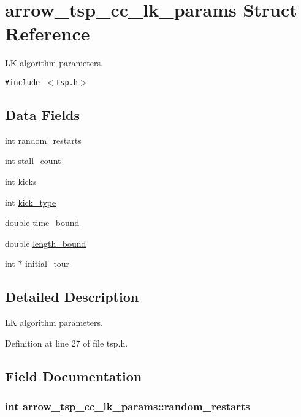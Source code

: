 \hypertarget{structarrow__tsp__cc__lk__params}{
\section{arrow\_\-tsp\_\-cc\_\-lk\_\-params Struct Reference}
\label{structarrow__tsp__cc__lk__params}
}
LK algorithm parameters.  


{\tt \#include $<$tsp.h$>$}

\subsection*{Data Fields}
\begin{CompactItemize}
\item 
int \hyperlink{structarrow__tsp__cc__lk__params_291c8a0ec4208ae75229c223dcf1160a}{random\_\-restarts}
\item 
int \hyperlink{structarrow__tsp__cc__lk__params_dee46e401d6f6eca9f9a0d1f376c6ebe}{stall\_\-count}
\item 
int \hyperlink{structarrow__tsp__cc__lk__params_5912b1978195270052497e56d8dbffae}{kicks}
\item 
int \hyperlink{structarrow__tsp__cc__lk__params_d5973ec2e377d3526911cfbc8deb2e47}{kick\_\-type}
\item 
double \hyperlink{structarrow__tsp__cc__lk__params_d4a71865c09d0624395d5a71b46bf8d5}{time\_\-bound}
\item 
double \hyperlink{structarrow__tsp__cc__lk__params_47292f99c63b9db5bad901b5aa5e42a1}{length\_\-bound}
\item 
int $\ast$ \hyperlink{structarrow__tsp__cc__lk__params_1093ecf5b1b8f5d198740bbaad77d4a2}{initial\_\-tour}
\end{CompactItemize}


\subsection{Detailed Description}
LK algorithm parameters. 

Definition at line 27 of file tsp.h.

\subsection{Field Documentation}
\hypertarget{structarrow__tsp__cc__lk__params_291c8a0ec4208ae75229c223dcf1160a}{
\subsubsection{\setlength{\rightskip}{0pt plus 5cm}int {\bf arrow\_\-tsp\_\-cc\_\-lk\_\-params::random\_\-restarts}}}
\label{structarrow__tsp__cc__lk__params_291c8a0ec4208ae75229c223dcf1160a}



